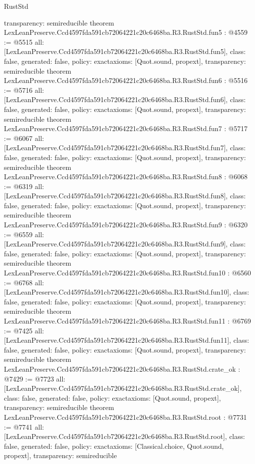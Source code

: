 \begin{lexlean}{RustStd}
\begin{coremodule}
{  transparency: semireducible
}
theorem LexLeanPreserve.Ccd4597fda591cb72064221c20c6468ba.R3.RustStd.fun5 : @4559 := @5515 {
  all: [LexLeanPreserve.Ccd4597fda591cb72064221c20c6468ba.R3.RustStd.fun5],
  class: false,
  generated: false,
  policy: exact{axioms: [Quot.sound, propext]},
  transparency: semireducible
}
theorem LexLeanPreserve.Ccd4597fda591cb72064221c20c6468ba.R3.RustStd.fun6 : @5516 := @5716 {
  all: [LexLeanPreserve.Ccd4597fda591cb72064221c20c6468ba.R3.RustStd.fun6],
  class: false,
  generated: false,
  policy: exact{axioms: [Quot.sound, propext]},
  transparency: semireducible
}
theorem LexLeanPreserve.Ccd4597fda591cb72064221c20c6468ba.R3.RustStd.fun7 : @5717 := @6067 {
  all: [LexLeanPreserve.Ccd4597fda591cb72064221c20c6468ba.R3.RustStd.fun7],
  class: false,
  generated: false,
  policy: exact{axioms: [Quot.sound, propext]},
  transparency: semireducible
}
theorem LexLeanPreserve.Ccd4597fda591cb72064221c20c6468ba.R3.RustStd.fun8 : @6068 := @6319 {
  all: [LexLeanPreserve.Ccd4597fda591cb72064221c20c6468ba.R3.RustStd.fun8],
  class: false,
  generated: false,
  policy: exact{axioms: [Quot.sound, propext]},
  transparency: semireducible
}
theorem LexLeanPreserve.Ccd4597fda591cb72064221c20c6468ba.R3.RustStd.fun9 : @6320 := @6559 {
  all: [LexLeanPreserve.Ccd4597fda591cb72064221c20c6468ba.R3.RustStd.fun9],
  class: false,
  generated: false,
  policy: exact{axioms: [Quot.sound, propext]},
  transparency: semireducible
}
theorem LexLeanPreserve.Ccd4597fda591cb72064221c20c6468ba.R3.RustStd.fun10 : @6560 := @6768 {
  all: [LexLeanPreserve.Ccd4597fda591cb72064221c20c6468ba.R3.RustStd.fun10],
  class: false,
  generated: false,
  policy: exact{axioms: [Quot.sound, propext]},
  transparency: semireducible
}
theorem LexLeanPreserve.Ccd4597fda591cb72064221c20c6468ba.R3.RustStd.fun11 : @6769 := @7425 {
  all: [LexLeanPreserve.Ccd4597fda591cb72064221c20c6468ba.R3.RustStd.fun11],
  class: false,
  generated: false,
  policy: exact{axioms: [Quot.sound, propext]},
  transparency: semireducible
}
theorem LexLeanPreserve.Ccd4597fda591cb72064221c20c6468ba.R3.RustStd.crate_ok : @7429 := @7723 {
  all: [LexLeanPreserve.Ccd4597fda591cb72064221c20c6468ba.R3.RustStd.crate_ok],
  class: false,
  generated: false,
  policy: exact{axioms: [Quot.sound, propext]},
  transparency: semireducible
}
theorem LexLeanPreserve.Ccd4597fda591cb72064221c20c6468ba.R3.RustStd.root : @7731 := @7741 {
  all: [LexLeanPreserve.Ccd4597fda591cb72064221c20c6468ba.R3.RustStd.root],
  class: false,
  generated: false,
  policy: exact{axioms: [Classical.choice, Quot.sound, propext]},
  transparency: semireducible
}


\end{coremodule}
\end{lexlean}

